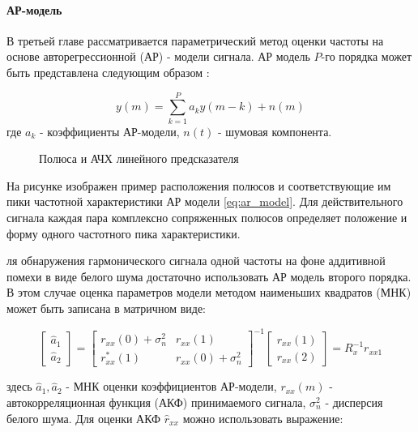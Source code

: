 \paragraph{АР-модель}

В третьей главе рассматривается параметрический метод оценки частоты на основе авторегрессионной (АР) - модели сигнала.
АР модель ${P}$-го порядка может быть представлена следующим образом \cite{marpl_book, saeed_book}:

\begin{equation}
	\label{eq:ar_model}
	y(m) = \sum \limits_{k=1}^{P} a_k y(m-k) + n(m)
\end{equation}
где ${a_k}$ - коэффициенты АР-модели, $n(t)$ - шумовая компонента.

\begin{figure}[H]
	\center{}
	\caption{Полюса и АЧХ линейного предсказателя}
	\label{pic:ar_poles}
\end{figure}

На рисунке \cite{pic:ar_poles} изображен пример расположения полюсов и соответствующие им пики частотной характеристики АР модели \ref{eq:ar_model}.
Для действительного сигнала каждая пара комплексно сопряженных полюсов определяет положение и форму одного частотного пика характеристики.

ля обнаружения гармонического сигнала одной частоты на фоне аддитивной помехи в виде белого шума достаточно использовать АР модель второго порядка.
В этом случае оценка параметров модели методом наименьших квадратов (МНК) может быть записана в матричном виде:

\begin{center}
\begin{equation}
	\label{eq:ar_coef_matrix}
	\left[ \begin{array}{c}
		\hat{a}_1 \\
		\hat{a}_2
	\end{array} \right]
	=
		\left[ \begin{array}{cc}
			r_{xx}(0)  + \sigma_n^2 & r_{xx}(1)\\
			r_{xx}^*(1) & r_{xx}(0) + \sigma_n^2 
		\end{array} \right]^{-1}
		\left[ \begin{array}{c}
			r_{xx}(1) \\
			r_{xx}(2)
		\end{array} \right]
	= R_x^{-1}r_{xx1}
\end{equation}
\end{center}
здесь ${\hat{a}_1, \hat{a}_2}$ - МНК оценки коэффициентов АР-модели, ${r_{xx}(m)}$ - автокорреляционная функция (АКФ) принимаемого сигнала,
${\sigma_n^2}$ - дисперсия белого шума.  Для оценки АКФ ${\hat{r}_{xx}}$ можно использовать выражение:

